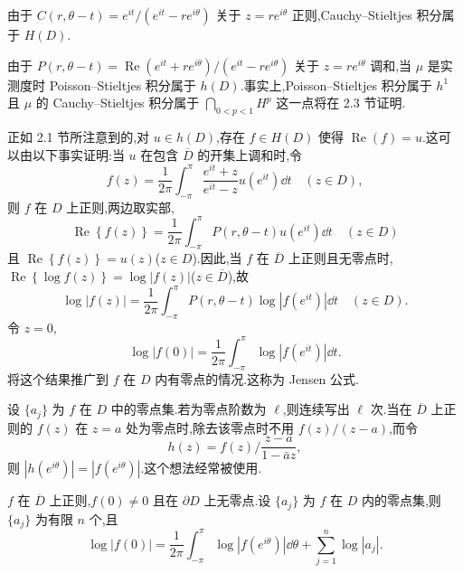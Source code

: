 由于 $C(r, \theta - t) = e^{it}/(e^{it} - re^{i\theta})$ 关于 $z = re^{i\theta}$ 正则,Cauchy--Stieltjes 积分属于 $H(D)$.

由于 $P(r, \theta - t) = \operatorname{Re}(e^{it} + re^{i\theta})/(e^{it} - re^{i\theta})$ 关于 $z = re^{i\theta}$ 调和,当 $\mu$ 是实测度时 Poisson--Stieltjes 积分属于 $h(D)$.事实上,Poisson--Stieltjes 积分属于 $h^{1}$ 且 $\mu$ 的 Cauchy--Stieltjes 积分属于 $\bigcap_{0 < p < 1}H^{p}$ 这一点将在 2.3 节证明.

正如 2.1 节所注意到的,对 $u \in h(D)$,存在 $f \in H(D)$ 使得 $\operatorname{Re}(f) = u$.这可以由以下事实证明:当 $u$ 在包含 $\overline{D}$ 的开集上调和时,令
\begin{equation*}
f(z) = \frac{1}{2\pi}\int_{-\pi}^{\pi}\frac{e^{it} + z}{e^{it} - z}u(e^{it})\dd t \quad (z \in D),
\end{equation*}
则 $f$ 在 $D$ 上正则,两边取实部,
\begin{equation*}
\operatorname{Re}\left\{f(z)\right\} = \frac{1}{2\pi}\int_{-\pi}^{\pi}P(r, \theta - t)u(e^{it})\dd t \quad (z \in D)
\end{equation*}
且 $\operatorname{Re}\left\{f(z)\right\} = u(z)$($z \in D$).因此,当 $f$ 在 $\overline{D}$ 上正则且无零点时,$\operatorname{Re}\left\{\log f(z)\right\} = \log|f(z)|$($z \in \overline{D}$),故
\begin{equation*}
\log|f(z)| = \frac{1}{2\pi}\int_{-\pi}^{\pi}P(r, \theta - t)\log|f(e^{it})|\dd t \quad (z \in D).
\end{equation*}
令 $z = 0$,
\begin{equation*}
\log|f(0)| = \frac{1}{2\pi}\int_{-\pi}^{\pi}\log|f(e^{it})|\dd t.
\end{equation*}
将这个结果推广到 $f$ 在 $D$ 内有零点的情况.这称为 Jensen 公式.

设 $\{a_{j}\}$ 为 $f$ 在 $D$ 中的零点集.若为零点阶数为 $\ell$,则连续写出 $\ell$ 次.当在 $\overline{D}$ 上正则的 $f(z)$ 在 $z = a$ 处为零点时,除去该零点时不用 $f(z)/(z - a)$,而令
\begin{equation*}
h(z) = f(z)\Big/\frac{z - a}{1 - \bar{a}z},
\end{equation*}
则 $|h(e^{i\theta})| = |f(e^{i\theta})|$.这个想法经常被使用.

\begin{proposition}\label{prop:2.2.1}
$f$ 在 $\overline{D}$ 上正则,$f(0) \neq 0$ 且在 $\partial D$ 上无零点.设 $\{a_{j}\}$ 为 $f$ 在 $D$ 内的零点集,则 $\{a_{j}\}$ 为有限 $n$ 个,且
\begin{equation*}
\log|f(0)| = \frac{1}{2\pi}\int_{-\pi}^{\pi}\log|f(e^{i\theta})|\dd\theta + \sum_{j = 1}^{n}\log|a_{j}|.
\end{equation*}
\end{proposition}


